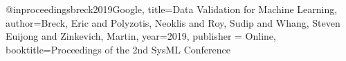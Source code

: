 @inproceedings{breck2019Google,
  title={Data Validation for Machine Learning},
  author={Breck, Eric and Polyzotis, Neoklis and Roy, Sudip and Whang, Steven Euijong and Zinkevich, Martin},
  year={2019},
  publisher = {Online},
  booktitle={Proceedings of the 2nd SysML Conference}
}





  

  
